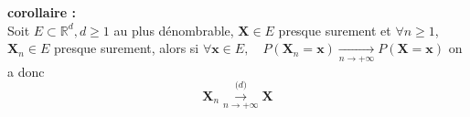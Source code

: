 \documentclass[12pt]{article}
\newif\ifcorrection
\newcommand{\corr}[1]{\ifcorrection{\color{lightblue}#1\color{black}}\fi}
\newcommand{\petitespace}{\vspace{0.5cm}}
\newcommand{\bb}[1]{\mathbb{#1}} %
\newcommand{\R}{\bb{R}} %
\renewcommand{\bf}[1]{\mathbf{#1}}
\renewcommand{\bf}[1]{\mathbf{#1}}
\newcommand{\esp}[1]{\bb{ E} \mathopen{}\left[#1\right]} %
\newcommand{\1}{\bb{1}} %
\newcommand{\cvn}{\underset{n\rightarrow+\infty}{\longrightarrow}} %
\newcommand{\cvl}{\overset{\mathcal (d)}{\cvn}} %
\begin{document}
\corr{\textbf{preuve : }

Soit $g$ une fonction continue bornée, on a $$\esp{g(X_n)}= \int_{\R^d}g(x)f_n(x) d\mu(x)$$ et $$ \esp{g(X)} = \int_{\R^d}g(x)f(x) d\mu(x)$$

On a 

\begin{align*}
	&\lvert \esp{g(X_n)}- \esp{g(X)}\rvert\\
	&=\lvert \int_{\R^d}g(x)f_n(x) d\mu(x)- \int_{\R^d}g(x)f(x) d\mu(x)\rvert \\
	&=\lvert \int_{\R^d}g(x)(f_n(x)-f(x)) d\mu(x)\rvert\\
	&\le  \int_{\R^d}\lvert g(x)\rvert\lvert f_n(x)-f(x)\rvert d\mu(x)\\
	&\le M \int_{\R^d}\lvert f_n(x)-f(x)\rvert d\mu(x) \text{avec $M= \sup\limits_{x \in \R^d}\lvert g(x)\rvert$}\\
	&\le M \int_{\R^d}[2(f(x)-f_n(x))^+-(f(x)-f_n(x))] d\mu(x) \\
	&\text{car $\lvert u \rvert = 2u^+-u$ avec $u^+=\sup(0,u)$ avec ici $u=f(x)-f_n(x)$}\\
	&\le M( \int_{\R^d}2(f(x)-f_n(x))^+d\mu(x) - \int_{\R^d}(f(x)-f_n(x)) d\mu(x))\\
	&\le 2M (\int_{\R^d}(f(x)-f_n(x))^+d\mu(x) -(1-1))\\
	&\le 2M \int_{\R^d}(f(x)-f_n(x))^+d\mu(x)
\end{align*}

or on a :

$\bullet f_n(x) \cvn f(x)$\petitespace

$\bullet (f(x)-f_n(x))^+ \le f(x)$\petitespace

$\bullet f \in L^1(\mu)$\petitespace

donc par Théorème de convergence dominée, on a 

\begin{align*}
		&\lvert \esp{g(X_n)}- \esp{g(X)}\rvert\\
		&\le 2M \int_{\R^d}(f(x)-f_n(x))^+d\mu(x) \\
		&\cvn 0\\
		&\implies \lim\limits_{n \to \infty}\lvert \esp{g(X_n)}- \esp{g(X)}\rvert=0
\end{align*}

Donc $X_n \cvl X$
}

\petitespace

\textbf{corollaire : }\\

Soit $E\subset \R^d, d \ge 1$ au plus dénombrable, $\bf X \in E$ presque surement et $\forall n \ge 1$, $\bf X_n \in E$ presque surement, alors si $\forall \bf x \in E, \quad P(\bf X_n=\bf x) \cvn P(\bf X=\bf x)$ on a donc $$ \bf X_n \cvl \bf X$$
\end{document}
